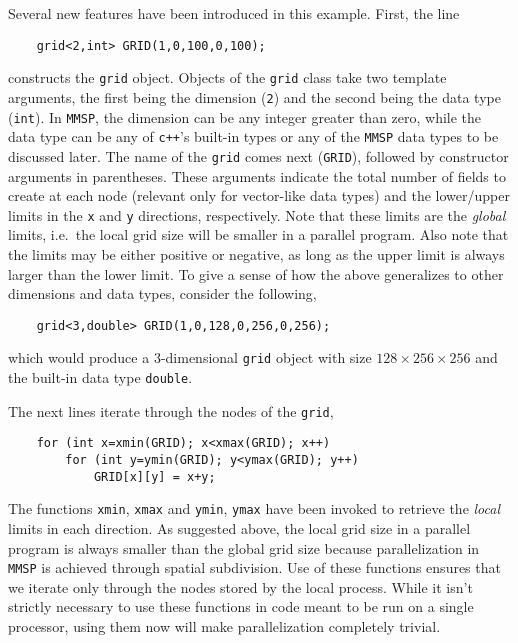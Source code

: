 Several new features have been introduced in this example.  First, the line
\begin{shadebox}
\begin{verbatim}
    grid<2,int> GRID(1,0,100,0,100);
\end{verbatim}
\end{shadebox}
constructs the {\tt grid} object.  Objects of the {\tt grid} class take two template arguments, the first being the dimension ({\tt 2}) and the second being the data type ({\tt int}).  In {\tt MMSP}, the dimension can be any integer greater than zero, while the data type can be any of {\tt c++}'s built-in types or any of the {\tt MMSP} data types to be discussed later.  The name of the {\tt grid} comes next ({\tt GRID}), followed by constructor arguments in parentheses.  These arguments indicate the total number of fields to create at each node (relevant only for vector-like data types) and the lower/upper limits in the {\tt x} and {\tt y} directions, respectively.  Note that these limits are the {\em global} limits, i.e.\ the local grid size will be smaller in a parallel program.  Also note that the limits may be either positive or negative, as long as the upper limit is always larger than the lower limit.  To give a sense of how the above generalizes to other dimensions and data types, consider the following,
\begin{shadebox}
\begin{verbatim}
    grid<3,double> GRID(1,0,128,0,256,0,256);
\end{verbatim}
\end{shadebox}
which would produce a 3-dimensional {\tt grid} object with size $128\times256\times256$ and the built-in data type {\tt double}.

The next lines iterate through the nodes of the {\tt grid},
\begin{shadebox}
\begin{verbatim}
    for (int x=xmin(GRID); x<xmax(GRID); x++)
        for (int y=ymin(GRID); y<ymax(GRID); y++)
            GRID[x][y] = x+y;
\end{verbatim}
\end{shadebox}
The functions {\tt xmin}, {\tt xmax} and {\tt ymin}, {\tt ymax} have been invoked to retrieve the {\em local} limits in each direction.  As suggested above, the local grid size in a parallel program is always smaller than the global grid size because parallelization in {\tt MMSP} is achieved through spatial subdivision.  Use of these functions ensures that we iterate only through the nodes stored by the local process.  While it isn't strictly necessary to use these functions in code meant to be run on a single processor, using them now will make parallelization completely trivial.

